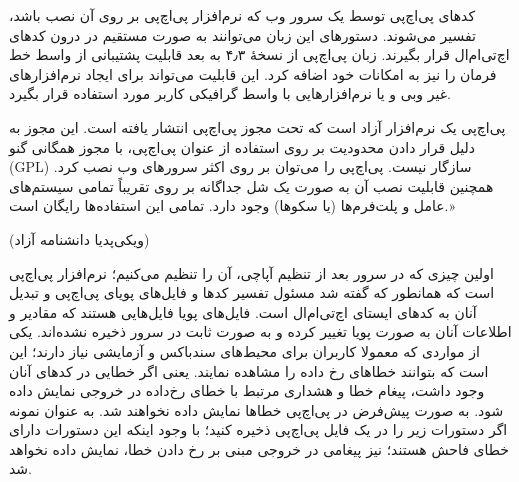 کدهای پی‌اچ‌پی توسط یک سرور وب که نرم‌افزار پی‌اچ‌پی بر روی آن نصب باشد، تفسیر می‌شوند. دستورهای این زبان می‌توانند به صورت مستقیم در درون کدهای اچ‌تی‌ام‌ال قرار بگیرند. زبان پی‌اچ‌پی از نسخهٔ ۴٫۳ به بعد قابلیت پشتیبانی از واسط خط فرمان را نیز به امکانات خود اضافه کرد. این قابلیت می‌تواند برای ایجاد نرم‌افزارهای غیر وبی و یا نرم‌افزارهایی با واسط گرافیکی کاربر مورد استفاده قرار بگیرد.

پی‌اچ‌پی یک نرم‌افزار آزاد است که تحت مجوز پی‌اچ‌پی انتشار یافته است. این مجوز به دلیل قرار دادن محدودیت بر روی استفاده از عنوان پی‌اچ‌پی، با مجوز همگانی گنو (GPL) سازگار نیست. پی‌اچ‌پی را می‌توان بر روی اکثر سرورهای وب نصب کرد. همچنین قابلیت نصب آن به صورت یک شل جداگانه بر روی تقریباً تمامی سیستم‌های عامل و پلت‌فرم‌ها (یا سکوها) وجود دارد. تمامی این استفاده‌ها رایگان است.» 

\begin{flushleft}
    (ویکی‌پدیا دانشنامه آزاد)
\end{flushleft}

اولین چیزی که در سرور بعد از تنظیم آپاچی، آن را تنظیم می‌کنیم؛ نرم‌افزار پی‌اچ‌پی است که همانطور که گفته شد مسئول تفسیر کدها و فایل‌های پویای پی‌اچ‌پی و تبدیل آنان به کدهای ایستای اچ‌تی‌ام‌ال است. فایل‌های پویا فایل‌هایی هستند که مقادیر و اطلاعات آنان به صورت پویا تغییر کرده و به صورت ثابت در سرور ذخیره نشده‌اند. یکی از مواردی که معمولا کاربران برای محیط‌های سندباکس و آزمایشی نیاز دارند؛ این است که بتوانند خطاهای رخ داده را مشاهده نمایند. یعنی اگر خطایی در کدهای آنان وجود داشت، پیغام خطا و هشداری مرتبط با خطای رخ‌داده در خروجی نمایش داده شود. به صورت پیش‌فرض در پی‌اچ‌پی خطاها نمایش داده نخواهند شد. به عنوان نمونه اگر دستورات زیر را در یک فایل پی‌اچ‌پی ذخیره کنید؛ با وجود اینکه این دستورات دارای خطای فاحش هستند؛ نیز پیغامی در خروجی مبنی بر رخ دادن خطا، نمایش داده نخواهد شد.
\newline
\begin{latin}
    
    
\end{latin}

